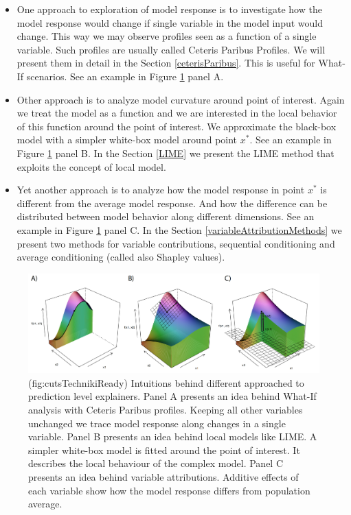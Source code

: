 \documentclass[]{krantz}
\providecommand{\tightlist}{%
  \setlength{\itemsep}{0pt}\setlength{\parskip}{0pt}}
\theoremstyle{definition}
\theoremstyle{definition}
\theoremstyle{definition}
\theoremstyle{remark}
\begin{document}
\begin{itemize}
\tightlist
\item
  One approach to exploration of model response is to investigate how
  the model response would change if single variable in the model input
  would change. This way we may observe profiles seen as a function of a
  single variable. Such profiles are usually called Ceteris Paribus
  Profiles. We will present them in detail in the Section
  \ref{ceterisParibus}. This is useful for What-If scenarios. See an
  example in Figure \ref{fig:cutsTechnikiReady} panel A.
\item
  Other approach is to analyze model curvature around point of interest.
  Again we treat the model as a function and we are interested in the
  local behavior of this function around the point of interest. We
  approximate the black-box model with a simpler white-box model around
  point \(x^*\). See an example in Figure \ref{fig:cutsTechnikiReady}
  panel B. In the Section \ref{LIME} we present the LIME method that
  exploits the concept of local model.
\item
  Yet another approach is to analyze how the model response in point
  \(x^*\) is different from the average model response. And how the
  difference can be distributed between model behavior along different
  dimensions. See an example in Figure \ref{fig:cutsTechnikiReady} panel
  C. In the Section \ref{variableAttributionMethods} we present two
  methods for variable contributions, sequential conditioning and
  average conditioning (called also Shapley values).
\end{itemize}

\begin{figure}

{\centering \includegraphics[width=0.99\linewidth]{figure/cuts_techniki_ready} 

}

\caption{(fig:cutsTechnikiReady) Intuitions behind different approached to prediction level explainers. Panel A presents an idea behind What-If analysis with Ceteris Paribus profiles. Keeping all other variables unchanged we trace model response along changes in a single variable. Panel B presents an idea behind local models like LIME. A simpler white-box model is fitted around the point of interest. It describes the local behaviour of the complex model. Panel C presents an idea behind variable attributions. Additive effects of each variable show how the model response differs from population average.}\label{fig:cutsTechnikiReady}
\end{figure}
\end{document}
